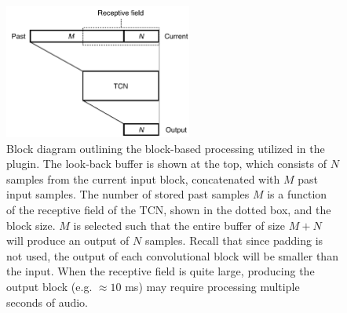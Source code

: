 \documentclass{article}
\begin{document}
\begin{figure}
  \centering
  \includegraphics[width=0.55\textwidth]{plugin-diagram.pdf}  
  \caption{Block diagram outlining the block-based processing utilized in the plugin. 
  The look-back buffer is shown at the top, which consists of $N$ samples from the current input block, 
  concatenated with $M$ past input samples. The number of stored past samples $M$ is a function 
  of the receptive field of the TCN, shown in the dotted box, and the block size. 
  $M$ is selected such that the entire buffer of size $M+N$ will produce an output of $N$ samples.
  Recall that since padding is not used, the output of each convolutional block will be smaller than the input. 
  When the receptive field is quite large, producing the output block (e.g. $\approx 10$ ms)
   may require processing multiple seconds of audio.}
  \label{fig:diagram}
\end{figure} 

%    
\end{document}

